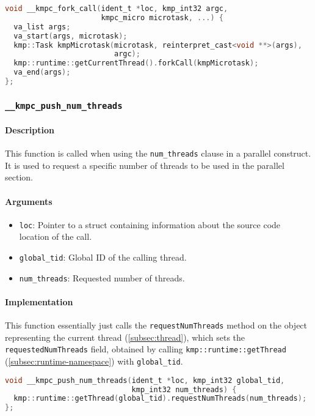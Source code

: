 \begin{lstlisting}[language=C, caption={\_\_kmpc\_fork\_call}, label={lst:fork-call},
                   escapechar=@]
void __kmpc_fork_call(ident_t *loc, kmp_int32 argc,
                      kmpc_micro microtask, ...) {
  va_list args;
  va_start(args, microtask);
  kmp::Task kmpMicrotask(microtask, reinterpret_cast<void **>(args),
                         argc);
  kmp::runtime::getCurrentThread().forkCall(kmpMicrotask);
  va_end(args);
};
\end{lstlisting}

\subsubsection{\texttt{\_\_kmpc\_push\_num\_threads}}
\label{subsubsec:kmpc-push-num-threads}

\paragraph{Description} This function is called when using the \texttt{num\_threads} clause in a
parallel construct. It is used to request a specific number of threads to be used in the parallel
section.

\paragraph{Arguments}
\begin{itemize}
	\item \texttt{loc}: Pointer to a struct containing information about the source code location
	      of the call.
	\item \texttt{global\_tid}: Global ID of the calling thread.
	\item \texttt{num\_threads}: Requested number of threads.
\end{itemize}

\paragraph{Implementation} This function essentially just calls the \texttt{requestNumThreads}
method on the object representing the current thread (\cref{subsec:thread}), which sets the
\texttt{requestedNumThreads} field, obtained by calling \texttt{kmp::runtime::getThread}
(\cref{subsec:runtime-namespace}) with \texttt{global\_tid}.

\begin{lstlisting}[language=C, caption={\_\_kmpc\_push\_num\_threads}, label={lst:push-num-threads},
                   escapechar=@]
void __kmpc_push_num_threads(ident_t *loc, kmp_int32 global_tid,
                             kmp_int32 num_threads) {
  kmp::runtime::getThread(global_tid).requestNumThreads(num_threads);
};
\end{lstlisting}

